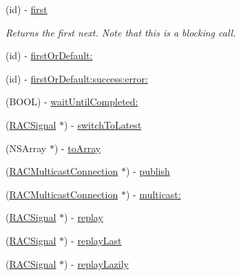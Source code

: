 \begin{DoxyCompactItemize}
\item 
\mbox{\label{category_r_a_c_signal_07_operations_08_a06f71dd31099b1ed555f0b9fcbbdf6f1}} 
(id) -\/ \mbox{\hyperlink{category_r_a_c_signal_07_operations_08_a06f71dd31099b1ed555f0b9fcbbdf6f1}{first}}
\begin{DoxyCompactList}\small\item\em Returns the first {\ttfamily next}. Note that this is a blocking call. \end{DoxyCompactList}\item 
(id) -\/ \mbox{\hyperlink{category_r_a_c_signal_07_operations_08_a51f980781f2dc9e662278d7db7b0cd38}{first\+Or\+Default\+:}}
\item 
(id) -\/ \mbox{\hyperlink{category_r_a_c_signal_07_operations_08_a12b765a16842e9c7aa1d13b00d8df09b}{first\+Or\+Default\+:success\+:error\+:}}
\item 
(B\+O\+OL) -\/ \mbox{\hyperlink{category_r_a_c_signal_07_operations_08_af4c476fc335ca830841bd4fd267f05ce}{wait\+Until\+Completed\+:}}
\item 
(\mbox{\hyperlink{interface_r_a_c_signal}{R\+A\+C\+Signal}} $\ast$) -\/ \mbox{\hyperlink{category_r_a_c_signal_07_operations_08_a0a6780c4580e1a5338a9a891f7c69ea1}{switch\+To\+Latest}}
\item 
(N\+S\+Array $\ast$) -\/ \mbox{\hyperlink{category_r_a_c_signal_07_operations_08_a5b7a649ea4635f423b73cd4924652fe5}{to\+Array}}
\item 
(\mbox{\hyperlink{interface_r_a_c_multicast_connection}{R\+A\+C\+Multicast\+Connection}} $\ast$) -\/ \mbox{\hyperlink{category_r_a_c_signal_07_operations_08_a16f260eea2cfd9a3953b95926d442a93}{publish}}
\item 
(\mbox{\hyperlink{interface_r_a_c_multicast_connection}{R\+A\+C\+Multicast\+Connection}} $\ast$) -\/ \mbox{\hyperlink{category_r_a_c_signal_07_operations_08_a55b43f4fbef7e430a4587ce13eab18cb}{multicast\+:}}
\item 
(\mbox{\hyperlink{interface_r_a_c_signal}{R\+A\+C\+Signal}} $\ast$) -\/ \mbox{\hyperlink{category_r_a_c_signal_07_operations_08_a6d7d83297f6b837dd5efc18c38483a94}{replay}}
\item 
(\mbox{\hyperlink{interface_r_a_c_signal}{R\+A\+C\+Signal}} $\ast$) -\/ \mbox{\hyperlink{category_r_a_c_signal_07_operations_08_a1a660e0db48169a1ea54288b196515b1}{replay\+Last}}
\item 
(\mbox{\hyperlink{interface_r_a_c_signal}{R\+A\+C\+Signal}} $\ast$) -\/ \mbox{\hyperlink{category_r_a_c_signal_07_operations_08_aa1a3386d321ec82ceff16d98eaf74d33}{replay\+Lazily}}

\end{DoxyCompactItemize}
